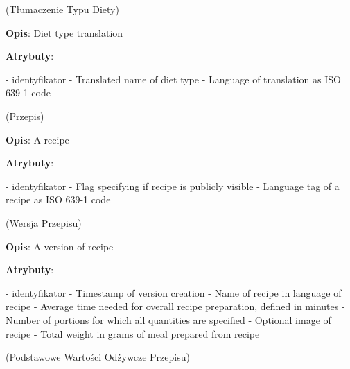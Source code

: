\begin{enumerate}[label={\textbf{KAT/\protect\threedigits{\theenumi}}}, wide, labelwidth=!, labelindent=0pt, labelsep=0pt, series=reqs]
     \label{kat:DietTypeTranslation} (Tłumaczenie Typu Diety)

    \textbf{Opis}: Diet type translation
    \par
    \textbf{Atrybuty}:
    \begin{itemize}[series=atr, wide, align=left, leftmargin=190pt]
         \label{kat:DietTypeTranslation:id} - identyfikator
         \label{kat:DietTypeTranslation:translation} - Translated name of diet type
         \label{kat:DietTypeTranslation:language} - Language of translation as ISO 639-1 code
    \end{itemize}

     \label{kat:Recipe} (Przepis)

    \textbf{Opis}: A recipe
    \par
    \textbf{Atrybuty}:
    \begin{itemize}[series=atr, wide, align=left, leftmargin=190pt]
         \label{kat:Recipe:id} - identyfikator
         \label{kat:Recipe:isPublic} - Flag specifying if recipe is publicly visible
         \label{kat:Recipe:language} - Language tag of a recipe as ISO 639-1 code
    \end{itemize}

     \label{kat:RecipeVersion} (Wersja Przepisu)

    \textbf{Opis}: A version of recipe
    \par
    \textbf{Atrybuty}:
    \begin{itemize}[series=atr, wide, align=left, leftmargin=190pt]
         \label{kat:RecipeVersion:id} - identyfikator
         \label{kat:RecipeVersion:editTimestamp} - Timestamp of version creation
         \label{kat:RecipeVersion:name} - Name of recipe in language of recipe
         \label{kat:RecipeVersion:preparationTimeMinutes} - Average time needed for overall recipe preparation, defined in minutes
         \label{kat:RecipeVersion:numberOfPortions} - Number of portions for which all quantities are specified
         \label{kat:RecipeVersion:image} - Optional image of recipe
         \label{kat:RecipeVersion:totalGramsWeight} - Total weight in grams of meal prepared from recipe
    \end{itemize}

     \label{kat:RecipeBasicNutritionData} (Podstawowe Wartości Odżywcze Przepisu)


\end{enumerate}
